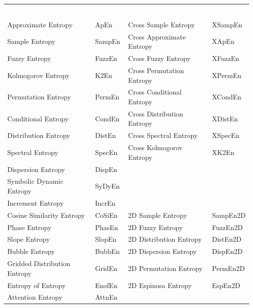 \documentclass[12pt, a4paper, titlepage, openany]{book}
\begin{document}
\newpage
\vspace{2cm} 
\begin{center}
\begin{table}[!ht]
\begin{tabular}{|p{6cm}|p{15mm}|p{6cm}|p{20mm}|}
 \hline
\rowcolor{ehone} \multicolumn{4}{|c|}{\textbf{\textcolor{white}{EntropyHub Function List}}} \\
\rowcolor{ehone} \emph{\textcolor{white}{Base Entropy}} & \emph{\textcolor{white}{Function}} & \emph{\textcolor{white}{Cross-Entropy}} & \emph{\textcolor{white}{Function}}\\
\hline

Approximate Entropy		&	ApEn			&	Cross Sample Entropy		&	XSampEn\\
Sample Entropy			&	SampEn			&	Cross Approximate Entropy	&	XApEn\\
Fuzzy Entropy			&	FuzzEn			&	Cross Fuzzy Entropy			&	XFuzzEn\\
Kolmogorov Entropy		&	K2En			&	Cross Permutation Entropy	&	XPermEn\\
Permutation Entropy		&	PermEn			&	Cross Conditional Entropy	&	XCondEn\\
Conditional Entropy		&	CondEn			&	Cross Distribution Entropy	&	XDistEn\\
Distribution Entropy	&	DistEn			&	Cross Spectral Entropy		&	XSpecEn\\
Spectral Entropy		&	SpecEn			&	Cross Kolmogorov Entropy	&	XK2En\\
Dispersion Entropy		&	DispEn	 	 	&		\						&	\\
Symbolic Dynamic Entropy &	SyDyEn			&		\						&	\\
Increment Entropy		&	IncrEn			&	\cellcolor{ehone} \emph{\textcolor{white}{Bidimensional Entropy}}		&	\cellcolor{ehone} \emph{\textcolor{white}{Function}}\\
Cosine Similarity Entropy &	CoSiEn			&	2D Sample Entropy 			&	SampEn2D\\
Phase Entropy			&	PhasEn			&	2D Fuzzy Entropy			&	FuzzEn2D\\
Slope Entropy			&	SlopEn			&	2D Distribution Entropy 	&	DistEn2D\\
Bubble Entropy			&	BubbEn		 	&	2D Dispersion Entropy 		&	DispEn2D\\
Gridded Distribution Entropy &	GridEn	  	&	2D Permutation Entropy		&	PermEn2D\\ 	 
Entropy of Entropy		& 	EnofEn	  		&	2D Espinosa Entropy			&	EspEn2D\\ 	 
Attention Entropy		&   AttnEn 		 	&		\						&	\\ 

\end{tabular}
\end{table}
\end{center}
\end{document}
